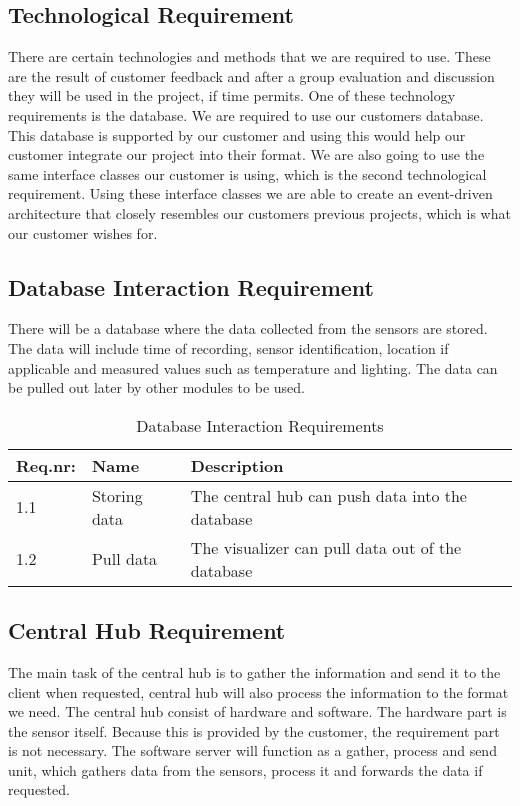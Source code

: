 \documentclass[../document]{subfiles}
\begin{document}
\subsection{Technological Requirement}
There are certain technologies and methods that we are required to use. These are the result of customer feedback and after a group evaluation and discussion they will be used in the project, if time permits. One of these technology requirements is the database. We are required to use our customers database. This database is supported by our customer and using this would help our customer integrate our project into their format. We are also going to use the same interface classes our customer is using, which is the second technological requirement. Using these interface classes we are able to create an event-driven architecture that closely resembles our customers previous projects, which is what our customer wishes for.

\subsection{Database Interaction Requirement}
There will be a database where the data collected from the sensors are stored. The data will include time of recording, sensor identification, location if applicable and measured values such as temperature and lighting. The data can be pulled out later by other modules to be used.

\begin{table}[H]
\caption{Database Interaction Requirements}
\centering
\begin{tabularx}{\textwidth}{|l|X|X|}
\hline
Req.nr:
&Name
&Description
\\ \hline 1.1
&Storing data
&The central hub can push data into the database
\\ \hline 1.2
&Pull data
&The visualizer can pull data out of the database
\\ \hline 
\end{tabularx}
\end{table}

\subsection{Central Hub Requirement}
The main task of the central hub is to gather the information and send it to the client when requested, central hub will also process the information to the format we need. The central hub consist of hardware and software. The hardware part is the sensor itself. Because this is provided by the customer, the requirement part is not necessary. The software server will function as a gather, process and send unit, which gathers data from the sensors, process it and forwards the data if requested.
\end{document}
